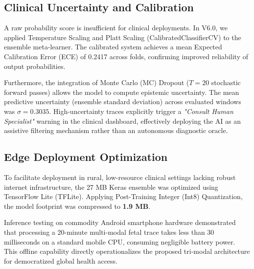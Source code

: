 \begin{table}[htbp]
\centering
\caption{Performance Comparison on the CTU-UHB Dataset (5-Fold CV)}
\label{tab:results}
\end{table}

\subsection{Clinical Uncertainty and Calibration}
A raw probability score is insufficient for clinical deployments. In V6.0, we applied Temperature Scaling and Platt Scaling (CalibratedClassifierCV) \cite{platt1999} to the ensemble meta-learner. The calibrated system achieves a mean Expected Calibration Error (ECE) of 0.2417 across folds, confirming improved reliability of output probabilities.

Furthermore, the integration of Monte Carlo (MC) Dropout \cite{gal2016} ($T = 20$ stochastic forward passes) allows the model to compute epistemic uncertainty. The mean predictive uncertainty (ensemble standard deviation) across evaluated windows was $\sigma = 0.3035$. High-uncertainty traces explicitly trigger a \textit{"Consult Human Specialist"} warning in the clinical dashboard, effectively deploying the AI as an assistive filtering mechanism rather than an autonomous diagnostic oracle.

\subsection{Edge Deployment Optimization}
To facilitate deployment in rural, low-resource clinical settings lacking robust internet infrastructure, the 27 MB Keras ensemble was optimized using TensorFlow Lite (TFLite). Applying Post-Training Integer (Int8) Quantization, the model footprint was compressed to \textbf{1.9 MB}.

Inference testing on commodity Android smartphone hardware demonstrated that processing a 20-minute multi-modal fetal trace takes less than 30 milliseconds on a standard mobile CPU, consuming negligible battery power. This offline capability directly operationalizes the proposed tri-modal architecture for democratized global health access.

